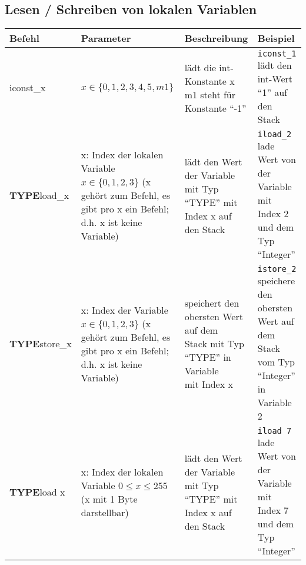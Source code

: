 \subsection{Lesen / Schreiben von lokalen Variablen}
\begin{table}[h]
	\centering
	\label{my-label}
	\begin{tabular}{l|l|l|l}
		Befehl & Parameter & Beschreibung & Beispiel \\ \hline
		iconst\_x	&	\multlineTable{$x\in \{0,1,2,3,4,5,m1\}$\\ } & \multlineTable{lädt die int-Konstante x\\ m1 steht für Konstante \enquote{-1}} & \multlineTable{\texttt{iconst\_1}\\ lädt den int-Wert \enquote{1} auf den Stack} \\ \hline
		\textbf{TYPE}load\_x	& 	\multlineTable{x: Index der lokalen\\ Variable $x\in \{ 0,1,2,3 \}$\\ (x gehört zum Befehl,\\ es gibt pro x ein Befehl;\\ d.h. x ist keine Variable) }	&	\multlineTable{lädt den Wert der Variable mit Typ\\ \enquote{TYPE} mit Index x auf den Stack} 	& \multlineTable{\texttt{iload\_2}\\ lade Wert von der Variable mit\\ Index 2 und dem Typ \enquote{Integer}}      \\ \hline
		
		\textbf{TYPE}store\_x	&	\multlineTable{x: Index der Variable\\ $x\in \{ 0,1,2,3 \}$\\ (x gehört zum Befehl,\\ es gibt pro x ein Befehl;\\ d.h. x ist keine Variable) }	&	\multlineTable{speichert den obersten Wert auf dem\\ Stack mit Typ \enquote{TYPE} in Variable\\ mit Index x}	& \multlineTable{\texttt{istore\_2}\\ speichere den obersten Wert auf\\ dem Stack vom Typ \enquote{Integer}\\ in Variable 2 }	\\ \hline
		
		\textbf{TYPE}load x	& \multlineTable{x: Index der lokalen\\ Variable $0 \leq x \leq 255$\\ (x mit 1 Byte darstellbar) }	&	\multlineTable{lädt den Wert der Variable mit Typ\\ \enquote{TYPE} mit Index x auf den Stack} 	& \multlineTable{\texttt{iload 7}\\ lade Wert von der Variable mit\\ Index 7 und dem Typ \enquote{Integer}}      \\ \hline
		

\end{tabular}
\end{table}
